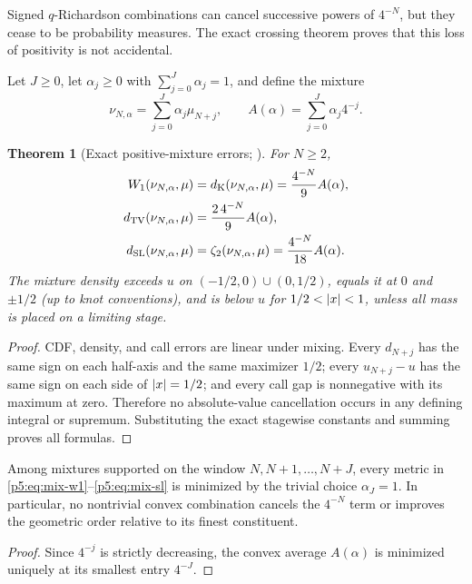 \documentclass[11pt,oneside]{article}
\numberwithin{equation}{section}
\newtheorem{theorem}{Theorem}[section]
\theoremstyle{definition}
\theoremstyle{remark}
\begin{document}
Signed $q$-Richardson combinations can cancel successive powers of $4^{-N}$, but they cease to be probability measures.  The exact crossing theorem proves that this loss of positivity is not accidental.

Let $J\ge0$, let $\alpha_j\ge0$ with $\sum_{j=0}^{J}\alpha_j=1$, and define the mixture
\begin{equation}
 \nu_{N,\alpha}=\sum_{j=0}^{J}\alpha_j\mu_{N+j},
 \qquad
 A(\alpha)=\sum_{j=0}^{J}\alpha_j4^{-j}.
 \label{p5:eq:mixture}
\end{equation}

\begin{theorem}[Exact positive-mixture errors; \newresult]
For $N\ge2$,
\begin{align}
 W_1(\nu_{N,\alpha},\mu)
 &=d_{\rm K}(\nu_{N,\alpha},\mu)
 =\frac{4^{-N}}9A(\alpha),
 \label{p5:eq:mix-w1}\\
 d_{\rm TV}(\nu_{N,\alpha},\mu)
 &=\frac{2\,4^{-N}}9A(\alpha),
 \label{p5:eq:mix-tv}\\
 d_{\rm SL}(\nu_{N,\alpha},\mu)
 &=\zeta_2(\nu_{N,\alpha},\mu)
 =\frac{4^{-N}}{18}A(\alpha).
 \label{p5:eq:mix-sl}
\end{align}
The mixture density exceeds $u$ on $(-1/2,0)\cup(0,1/2)$, equals it at $0$ and $\pm1/2$ (up to knot conventions), and is below $u$ for $1/2<\left\lvert x\right\rvert<1$, unless all mass is placed on a limiting stage.
\end{theorem}

\begin{proof}
CDF, density, and call errors are linear under mixing.  Every $d_{N+j}$ has the same sign on each half-axis and the same maximizer $1/2$; every $u_{N+j}-u$ has the same sign on each side of $\left\lvert x\right\rvert=1/2$; and every call gap is nonnegative with its maximum at zero.  Therefore no absolute-value cancellation occurs in any defining integral or supremum.  Substituting the exact stagewise constants and summing proves all formulas.
\end{proof}

\begin{corollary}
Among mixtures supported on the window $N,N+1,\ldots,N+J$, every metric in \eqref{p5:eq:mix-w1}--\eqref{p5:eq:mix-sl} is minimized by the trivial choice $\alpha_J=1$.  In particular, no nontrivial convex combination cancels the $4^{-N}$ term or improves the geometric order relative to its finest constituent.
\end{corollary}

\begin{proof}
Since $4^{-j}$ is strictly decreasing, the convex average $A(\alpha)$ is minimized uniquely at its smallest entry $4^{-J}$.
\end{proof}
\end{document}
